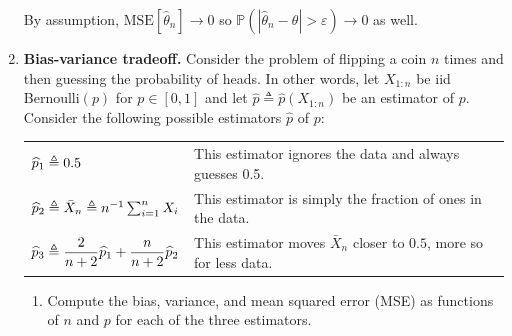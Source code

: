 \documentclass[11pt]{report}
\newcommand{\teq}{\triangleq}
\renewcommand{\P}{\mathbb{P}}
\newcommand{\ep}{\varepsilon}
\newcommand{\abs}[1]{\left\lvert#1\right\rvert}
\begin{document}
\begin{enumerate}[1.]
          By assumption, $\text{MSE}[\hat \theta_n] \to 0$ so $\P(\abs{\hat \theta_n - \theta} > \ep) \to 0$ as well.
          \color{black}


          \pagebreak

    \item {\bf Bias-variance tradeoff.} Consider the problem of flipping a coin $n$ times and then guessing the probability of heads. In other words, let $X_{1:n}$ be iid Bernoulli$(p)$ for $p\in[0,1]$ and let $\widehat p \teq \widehat p(X_{1:n})$ be an estimator of $p$.  Consider the following possible estimators $\widehat p$ of $p$:

          \begin{center}
              \begin{tabular}{ll}
                  $\displaystyle \vphantom{\frac{1}{1}} \widehat p_1 \teq 0.5$                                                   & This estimator ignores the data and always guesses 0.5.                 \\
                  $\displaystyle \vphantom{\frac{1}{1}} \widehat p_2 \teq  \bar X_n  \teq \textstyle n^{-1} \sum_{i=1}^n X_i$    & This estimator is simply the fraction of ones in the data.
                  \\
                  $\displaystyle \vphantom{\frac{1}{1}} \widehat p_3 \teq \frac{2}{n+2}\widehat p_1 + \frac{n}{n+2}\widehat p_2$ & This estimator moves $\bar X_n$ closer to $0.5$, more so for less data. \\
              \end{tabular}
          \end{center}

          \begin{enumerate}
              \item Compute the bias, variance, and mean squared error (MSE) as functions of $n$ and $p$ for each of the three estimators.


\end{enumerate}
\end{enumerate}
\end{document}
